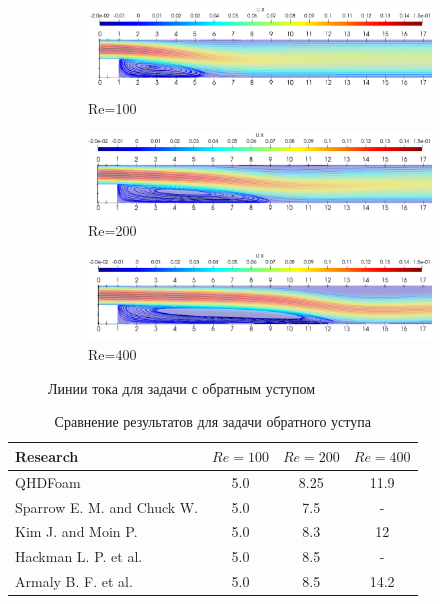 \begin{figure}[!h]
    \centering
    \begin{subfigure}{\textwidth}
        \centering
        \includegraphics[scale=0.4]{pics/Re100.png}
        \caption{Re=100}
    \end{subfigure}
    \begin{subfigure}{\textwidth}
        \centering
        \includegraphics[scale=0.4]{pics/Re200.png}
        \caption{Re=200}
    \end{subfigure}
    \begin{subfigure}{\textwidth}
        \centering
        \includegraphics[scale=0.4]{pics/Re400.png}
        \caption{Re=400}
    \end{subfigure}
    \caption{Линии тока для задачи с обратным уступом}
    \label{StreamRe100}
\end{figure}


\begin{table}[!hb]
\caption {Сравнение результатов для задачи обратного уступа}
\noindent\begin{tabular}{l|ccc}
Research & $Re=100$ & $Re=200$  & $Re=400$ \\
\hline
QHDFoam & 5.0 & 8.25 & 11.9\\
Sparrow E. M. and Chuck W.\cite{Sparrow1987} & 5.0 & 7.5 & -\\
Kim J. and Moin P.\cite{Kim1985} & 5.0 & 8.3 & 12 \\
Hackman L. P. et al.\cite{Hackman1984} & 5.0 & 8.5 & -\\
\hline
Armaly B. F. et al.\cite{Armaly1983} & 5.0 & 8.5 & 14.2
\end{tabular}
\label{table:tabBackward}
\end{table}

